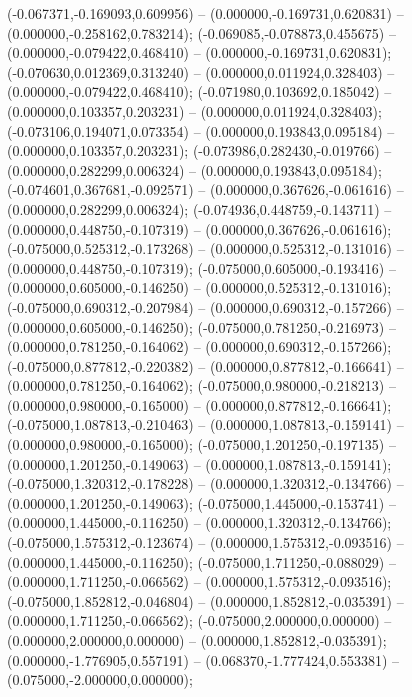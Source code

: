  (-0.067371,-0.169093,0.609956) -- (0.000000,-0.169731,0.620831) -- (0.000000,-0.258162,0.783214);
 (-0.069085,-0.078873,0.455675) -- (0.000000,-0.079422,0.468410) -- (0.000000,-0.169731,0.620831);
 (-0.070630,0.012369,0.313240) -- (0.000000,0.011924,0.328403) -- (0.000000,-0.079422,0.468410);
 (-0.071980,0.103692,0.185042) -- (0.000000,0.103357,0.203231) -- (0.000000,0.011924,0.328403);
 (-0.073106,0.194071,0.073354) -- (0.000000,0.193843,0.095184) -- (0.000000,0.103357,0.203231);
 (-0.073986,0.282430,-0.019766) -- (0.000000,0.282299,0.006324) -- (0.000000,0.193843,0.095184);
 (-0.074601,0.367681,-0.092571) -- (0.000000,0.367626,-0.061616) -- (0.000000,0.282299,0.006324);
 (-0.074936,0.448759,-0.143711) -- (0.000000,0.448750,-0.107319) -- (0.000000,0.367626,-0.061616);
 (-0.075000,0.525312,-0.173268) -- (0.000000,0.525312,-0.131016) -- (0.000000,0.448750,-0.107319);
 (-0.075000,0.605000,-0.193416) -- (0.000000,0.605000,-0.146250) -- (0.000000,0.525312,-0.131016);
 (-0.075000,0.690312,-0.207984) -- (0.000000,0.690312,-0.157266) -- (0.000000,0.605000,-0.146250);
 (-0.075000,0.781250,-0.216973) -- (0.000000,0.781250,-0.164062) -- (0.000000,0.690312,-0.157266);
 (-0.075000,0.877812,-0.220382) -- (0.000000,0.877812,-0.166641) -- (0.000000,0.781250,-0.164062);
 (-0.075000,0.980000,-0.218213) -- (0.000000,0.980000,-0.165000) -- (0.000000,0.877812,-0.166641);
 (-0.075000,1.087813,-0.210463) -- (0.000000,1.087813,-0.159141) -- (0.000000,0.980000,-0.165000);
 (-0.075000,1.201250,-0.197135) -- (0.000000,1.201250,-0.149063) -- (0.000000,1.087813,-0.159141);
 (-0.075000,1.320312,-0.178228) -- (0.000000,1.320312,-0.134766) -- (0.000000,1.201250,-0.149063);
 (-0.075000,1.445000,-0.153741) -- (0.000000,1.445000,-0.116250) -- (0.000000,1.320312,-0.134766);
 (-0.075000,1.575312,-0.123674) -- (0.000000,1.575312,-0.093516) -- (0.000000,1.445000,-0.116250);
 (-0.075000,1.711250,-0.088029) -- (0.000000,1.711250,-0.066562) -- (0.000000,1.575312,-0.093516);
 (-0.075000,1.852812,-0.046804) -- (0.000000,1.852812,-0.035391) -- (0.000000,1.711250,-0.066562);
 (-0.075000,2.000000,0.000000) -- (0.000000,2.000000,0.000000) -- (0.000000,1.852812,-0.035391);
 (0.000000,-1.776905,0.557191) -- (0.068370,-1.777424,0.553381) -- (0.075000,-2.000000,0.000000);
